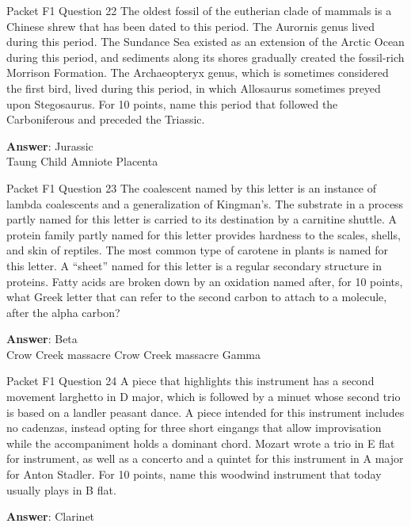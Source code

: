 \begin{frame}{Packet F1 Question 22}
The oldest fossil of the   eutherian clade of   mammals is a Chinese shrew that has been   dated to this period. The Aurornis genus lived during this period. The Sundance Sea existed as an     extension of the Arctic Ocean during this period, and sediments   along its shores gradually created the fossil-rich Morrison Formation. The Archaeopteryx genus, which is sometimes considered the first bird, lived during this period, in which Allosaurus sometimes preyed upon Stegosaurus.   For 10 points, name this period that followed the Carboniferous and preceded the Triassic.

\textbf{Answer}: Jurassic\\
 Taung Child
 Amniote
 Placenta
\end{frame}

\begin{frame}{Packet F1 Question 23}
The coalescent named by     this letter is an   instance of lambda coalescents and a generalization of Kingman's.  The substrate in a process partly named for this letter is carried to its destination by a carnitine shuttle. A protein family partly   named for this letter provides hardness   to the scales, shells, and skin of reptiles. The most common type of carotene in     plants is named for this letter. A “sheet” named for this letter is a regular secondary structure in proteins. Fatty acids are broken down by an oxidation named after, for 10 points, what Greek letter that can refer to the second carbon to attach to a molecule, after the alpha carbon?

\textbf{Answer}: Beta\\
 Crow Creek massacre
 Crow Creek massacre
 Gamma
\end{frame}

\begin{frame}{Packet F1 Question 24}
A piece that highlights this instrument has a second movement larghetto in D major, which is followed by a minuet whose second trio is based on a landler peasant dance. A piece intended for this instrument includes no cadenzas, instead opting for three short eingangs that allow improvisation while the accompaniment holds a dominant chord. Mozart wrote a trio in E flat for instrument, as well as a concerto and a quintet for this instrument   in A major for Anton Stadler. For 10 points,     name this woodwind instrument that today usually plays   in B flat.

\textbf{Answer}: Clarinet\\
\end{frame}

